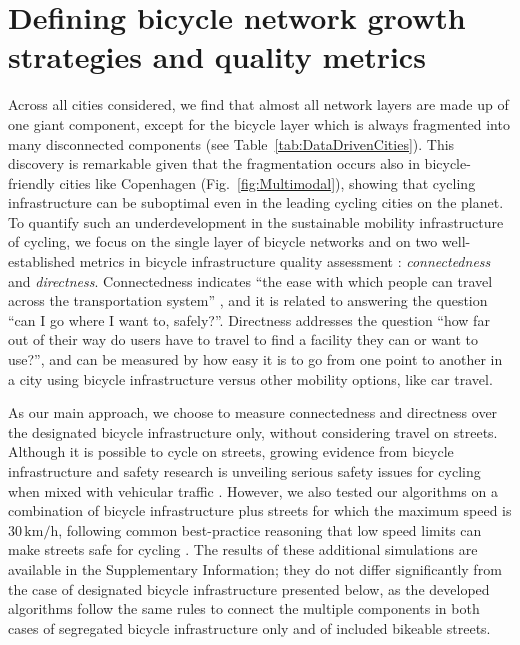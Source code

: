 \section{Defining bicycle network growth strategies and quality metrics}
Across all cities considered, we find that almost all network layers are made up of one giant component, except for the bicycle layer which is always fragmented into many disconnected components (see Table~\ref{tab:DataDrivenCities}). This discovery is remarkable given that the fragmentation occurs also in bicycle-friendly cities like Copenhagen (Fig.~\ref{fig:Multimodal}), showing that cycling infrastructure can be suboptimal even in the leading cycling cities on the planet. To quantify such an underdevelopment in the sustainable mobility infrastructure of cycling, we focus on the single layer of bicycle networks and on two well-established metrics in bicycle infrastructure quality assessment \cite{Krizek2005Discontinuities,movement2013Cycling,Dobrovolny2014Pedestrian,Twaddell2018Multimodal,Beck2019Space}: \textit{connectedness} and \textit{directness}. Connectedness indicates ``the ease with which people can travel across the transportation system'' \cite{Twaddell2018Multimodal}, and it is related to answering the question ``can I go where I want to, safely?''. Directness addresses the question ``how far out of their way do users have to travel to find a facility they can or want to use?'', and can be measured by how easy it is to go from one point to another in a city using bicycle infrastructure versus other mobility options, like car travel.

As our main approach, we choose to measure connectedness and directness over the designated bicycle infrastructure only, without considering travel on streets. Although it is possible to cycle on streets, growing evidence from bicycle infrastructure and safety research is unveiling serious safety issues for cycling when mixed with vehicular traffic \cite{Reynolds2009impact,Teschke2012route,Pucher2016Safer}. However, we also tested our algorithms on a combination of bicycle infrastructure plus streets for which the maximum speed is $30\,\mathrm{km/h}$, following common best-practice reasoning that low speed limits can make streets safe for cycling \cite{global2016global}. The results of these additional simulations are available in the Supplementary Information; they do not differ significantly from the case of designated bicycle infrastructure presented below, as the developed algorithms follow the same rules to connect the multiple components in both cases of segregated bicycle infrastructure only and of included bikeable streets.

